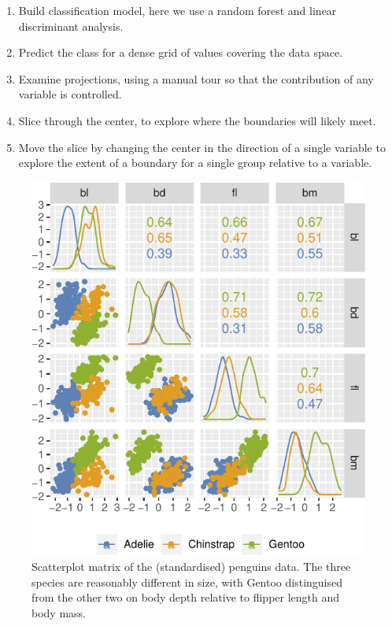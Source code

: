 \documentclass[]{interact}
\theoremstyle{plain}%
\theoremstyle{definition}
\theoremstyle{remark}
\providecommand{\tightlist}{%
  \setlength{\itemsep}{0pt}\setlength{\parskip}{0pt}}
\def\tightlist{}
\begin{document}
\begin{enumerate}
\def\labelenumi{\arabic{enumi}.}
\tightlist
\item
  Build classification model, here we use a random forest and linear
  discriminant analysis.
\item
  Predict the class for a dense grid of values covering the data space.
\item
  Examine projections, using a manual tour so that the contribution of
  any variable is controlled.
\item
  Slice through the center, to explore where the boundaries will likely
  meet.
\item
  Move the slice by changing the center in the direction of a single
  variable to explore the extent of a boundary for a single group
  relative to a variable.
\end{enumerate}

\begin{figure}

{\centering \includegraphics[width=0.8\linewidth]{paper_files/figure-latex/penguins-scatmat-1} 

}

\caption{Scatterplot matrix of the (standardised) penguins data. The three species are reasonably different in size, with Gentoo distinguised from the other two on body depth relative to flipper length and body mass.}\label{fig:penguins-scatmat}
\end{figure}
\end{document}
